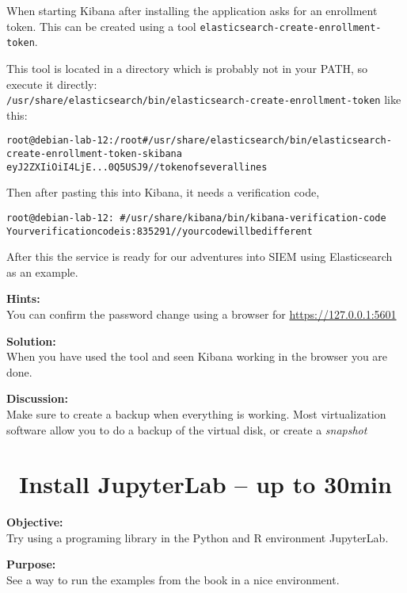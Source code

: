 \documentclass[a4paper,11pt,notitlepage]{report}
\begin{document}
When starting Kibana after installing the application asks for an enrollment token. This can be created using a tool \verb+elasticsearch-create-enrollment-token+.

This tool is located in a directory which is probably not in your PATH, so execute it directly:\\
\verb+/usr/share/elasticsearch/bin/elasticsearch-create-enrollment-token+ like this:


\begin{alltt}
root@debian-lab-12:/root# /usr/share/elasticsearch/bin/elasticsearch-create-enrollment-token -s kibana
eyJ2ZXIiOiI4LjE...0Q5USJ9 // token of several lines
\end{alltt}

Then after pasting this into Kibana, it needs a verification code,

\begin{alltt}
root@debian-lab-12:~# /usr/share/kibana/bin/kibana-verification-code
Your verification code is:  835 291 // your code will be different
\end{alltt}

After this the service is ready for our adventures into SIEM using Elasticsearch as an example.

{\bf Hints:}\\
You can confirm the password change using a browser for \url{https://127.0.0.1:5601}


{\bf Solution:}\\
When you have used the tool and seen Kibana working in the browser you are done.

{\bf Discussion:}\\
{\LARGE Make sure to create a backup when everything is working. Most virtualization software allow you to do a backup of the virtual disk, or create a \emph{snapshot}}


\chapter{\faInfoCircle\ Install JupyterLab -- up to 30min}
\label{ex-python-Jupyterlab}


{\bf Objective:}\\
Try using a programing library in the Python and R environment JupyterLab.

{\bf Purpose:}\\
See a way to run the examples from the book in a nice environment.
\end{document}
